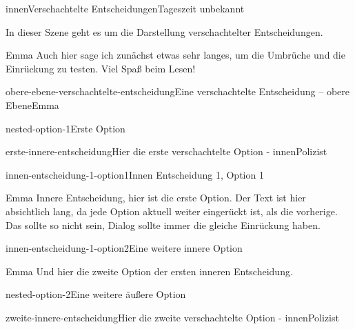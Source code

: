 \documentclass[12pt]{article}
\begin{document}
    \begin{scene}{innen}{Verschachtelte Entscheidungen}{Tageszeit unbekannt}
        \begin{scenedescription}
            In dieser Szene geht es um die Darstellung verschachtelter Entscheidungen.
        \end{scenedescription}

        \begin{dialog}{Emma}
            Auch hier sage ich zunächst etwas sehr langes, um die Umbrüche und die Einrückung zu testen.
            Viel Spaß beim Lesen!
        \end{dialog}

        \begin{decision}{obere-ebene-verschachtelte-entscheidung}{Eine verschachtelte Entscheidung -- obere Ebene}{Emma}
            \begin{option}{nested-option-1}{Erste Option}
                \begin{decision}{erste-innere-entscheidung}{Hier die erste verschachtelte Option - innen}{Polizist}
                    \begin{option}{innen-entscheidung-1-option1}{Innen Entscheidung 1, Option 1}
                        \begin{dialog}{Emma}
                            Innere Entscheidung, hier ist die erste Option.
                            Der Text ist hier absichtlich lang, da jede Option aktuell weiter eingerückt ist, als die vorherige.
                            Das sollte so nicht sein, Dialog sollte immer die gleiche Einrückung haben.
                        \end{dialog}
                    \end{option}
                    \begin{option}{innen-entscheidung-1-option2}{Eine weitere innere Option}
                        \begin{dialog}{Emma}
                            Und hier die zweite Option der ersten inneren Entscheidung.
                        \end{dialog}
                    \end{option}
                \end{decision}
            \end{option}
            \begin{option}{nested-option-2}{Eine weitere äußere Option}
                \begin{decision}{zweite-innere-entscheidung}{Hier die zweite verschachtelte Option - innen}{Polizist}

\end{decision}
\end{option}
\end{decision}
\end{scene}
\end{document}
